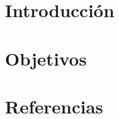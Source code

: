 \documentclass[titlepage,openany,a4paper,spanish]{book}
\begin{document}




\tableofcontents

\listoffigures

\chapter{Introducción} %


\chapter{Objetivos}


\chapter{Referencias}

\end{document}
